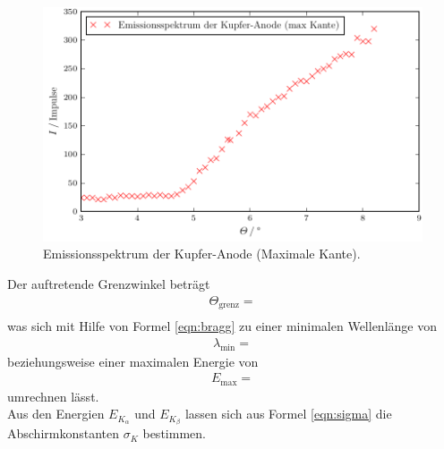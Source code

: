 \begin{figure}
  \centering
  \includegraphics{build/plot_3.pdf}
  \caption{Emissionsspektrum der Kupfer-Anode (Maximale Kante).}
  \label{fig:plot3}
\end{figure}
Der auftretende Grenzwinkel beträgt
\begin{align*}
  \Theta_{\text{grenz}} =  \\
\end{align*}
was sich mit Hilfe von Formel \eqref{eqn:bragg} zu einer minimalen Wellenlänge von
\begin{align*}
  \lambda_{\text{min}} = 
\end{align*}
beziehungsweise einer maximalen Energie von
\begin{align*}
  E_{\text{max}} = 
\end{align*}
umrechnen lässt.\\
Aus den Energien $E_{K_\alpha}$ und $E_{K_\beta}$ lassen sich aus Formel \eqref{eqn:sigma} die Abschirmkonstanten $\sigma_K$ bestimmen.
